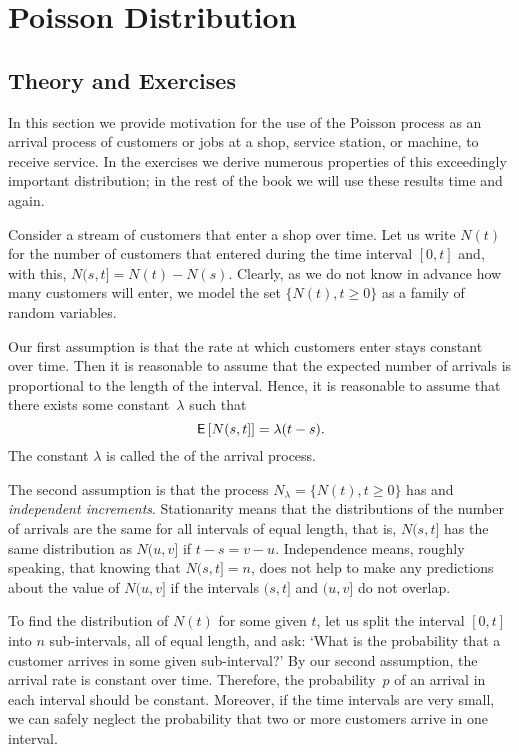 \section{Poisson Distribution}
\label{sec:poisson-distribution}

\subsection*{Theory and Exercises}



In this section we provide motivation for the use of the Poisson process as an arrival process of customers or jobs at a shop, service station, or machine, to receive service.  In the exercises we derive numerous  properties of  this exceedingly important distribution; in the rest of the book we will use these results time and again.

Consider a stream of customers that enter a shop over time.
Let us write $N(t)$ for the number of customers that entered during the time interval $[0,t]$ and, with this, $N(s, t] = N(t)-N(s)$.
Clearly, as we do not know in advance how many customers will enter, we model the set $\{N(t), t\geq 0\}$ as a family of  random variables.

Our first assumption is that the rate at which customers enter stays constant over time. Then it is reasonable to assume that
the expected number of arrivals is proportional to the  length of
the interval. Hence, it is reasonable to assume that there exists some
constant~$\lambda$ such that
\begin{equation}
  \label{eq:6}
 \,\mathsf{E}\left[N(s,t]\right] = \lambda (t-s).
\end{equation}
The constant $\lambda$ is called the  of the arrival process.


The second assumption is that the process $N_\lambda = \{N(t), t\geq 0\}$ has  and \emph{independent increments}.
Stationarity means that the distributions of the number of arrivals are the same for all intervals of equal length, that is, 
$N(s,t]$ has the same distribution as $N(u, v]$ if $t-s = v-u$.
Independence means, roughly speaking, that knowing that $N(s,t]= n$, does not help to make any predictions about the value of $N(u, v]$ if the intervals $(s,t]$ and $(u, v]$ do not overlap.



To find the distribution of $N(t)$ for some given $t$, let us split the interval $[0,t]$ into $n$ sub-intervals, all of equal length, and ask: `What is the probability that a customer arrives in some given sub-interval?'
By our second assumption, the arrival rate is constant over time.
Therefore, the probability~$p$ of an arrival in each interval should be constant.
Moreover, if the time intervals are very small, we can safely neglect the probability that two or more customers arrive in one interval.


